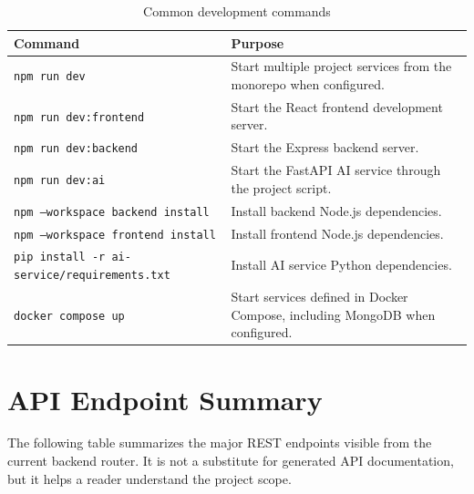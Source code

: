 \begin{table}[H]
\centering
\caption{Common development commands}
\label{tab:dev-commands}
\begin{tabularx}{\textwidth}{p{5.2cm} X}
\toprule
\textbf{Command} & \textbf{Purpose}\\
\midrule
\texttt{npm run dev} & Start multiple project services from the monorepo when configured.\\
\texttt{npm run dev:frontend} & Start the React frontend development server.\\
\texttt{npm run dev:backend} & Start the Express backend server.\\
\texttt{npm run dev:ai} & Start the FastAPI AI service through the project script.\\
\texttt{npm --workspace backend install} & Install backend Node.js dependencies.\\
\texttt{npm --workspace frontend install} & Install frontend Node.js dependencies.\\
\texttt{pip install -r ai-service/requirements.txt} & Install AI service Python dependencies.\\
\texttt{docker compose up} & Start services defined in Docker Compose, including MongoDB when configured.\\
\bottomrule
\end{tabularx}
\end{table}

\section{API Endpoint Summary}

The following table summarizes the major REST endpoints visible from the current backend router. It is not a substitute for generated API documentation, but it helps a reader understand the project scope.

